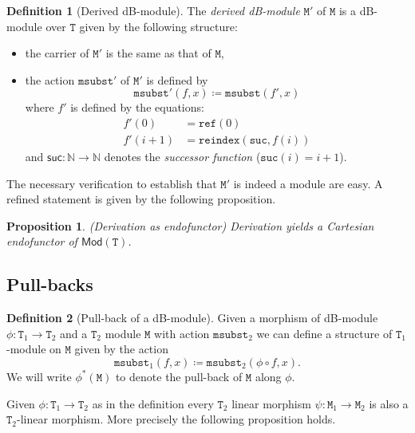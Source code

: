 \documentclass[a4paper,twoside,12pt,draft]{article}
\newtheorem{proposition}{Proposition}
\theoremstyle{definition}
\newtheorem{definition}{Definition}
\theoremstyle{remark}
\newcommand{\NN}{\mathbb{N}}
\newcommand{\TT}{\mathtt{T}}
\newcommand{\MM}{\mathtt{M}}
\newcommand{\refe}{\mathtt{ref}}
\newcommand{\reindex}{\mathtt{reindex}}
\newcommand{\msubst}{\mathtt{msubst}}
\begin{document}
\begin{definition}[Derived dB-module]
  The \emph{derived dB-module} $\MM'$ of $\MM$ is a dB-module over
  $\TT$ given by the following structure:
  \begin{itemize}
  \item the carrier of $\MM'$ is the same as that of $\MM$,
  \item the action $\msubst'$ of $\MM'$ is defined by
    \begin{equation*}
    \msubst'(f,x) \coloneqq \msubst(f',x)
  \end{equation*}
  where $f'$ is defined by the equations:
  \begin{align*}
    f'(0) &= \refe(0)\\
    f'(i+1) &= \reindex(\mathtt{suc},f(i))
  \end{align*}
  and $\mathsf{suc} \colon \NN \to \NN$ denotes the \emph{successor
    function} ($\mathtt{suc}(i) = i+1$).
  \end{itemize}
\end{definition}

The necessary verification to establish that $\MM'$ is indeed a module
are easy.  A refined statement is given by the following proposition.

\begin{proposition}(Derivation as endofunctor)
  \label{prop:derivation-endo}
  Derivation yields a Cartesian endofunctor of $\mathsf{Mod}(\TT)$.
\end{proposition}

\subsection{Pull-backs}
\label{sec:pull-backs}

\begin{definition}[Pull-back of a dB-module]
  Given a morphism of dB-module $\phi\colon \TT_1 \to \TT_2$ and a
  $\TT_2$ module $\MM$ with action $\msubst_2$ we can define a
  structure of $\TT_1$-module on $\MM$ given by the action
  \begin{equation*}
    \msubst_1(f,x) \coloneqq \msubst_2(\phi \circ f, x).
  \end{equation*}
  We will write $\phi^*(\MM)$ to denote the pull-back of $\MM$ along
  $\phi$.
\end{definition}

Given $\phi\colon \TT_1 \to \TT_2$ as in the definition every $\TT_2$
linear morphism $\psi\colon \MM_1 \to \MM_2$ is also a $\TT_2$-linear
morphism.  More precisely the following proposition holds.
\end{document}
